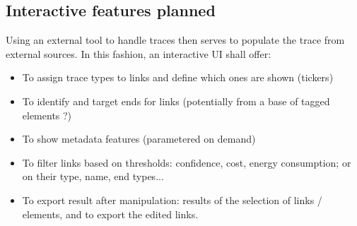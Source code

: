 \subsection{Interactive features planned}
Using an external tool to handle traces then serves to populate the trace from external sources. In this fashion, an interactive UI shall offer:
\begin{itemize}
    \item To assign trace types to links and define which ones are shown (tickers)
    \item To identify and target ends for links (potentially from a base of tagged elements ?)
    \item To show metadata features (parametered on demand)
    \item To filter links based on thresholds: confidence, cost, energy consumption; or on their type, name, end types...
    \item To export result after manipulation: results of the selection of links / elements, and to export the edited links.
\end{itemize}
 
